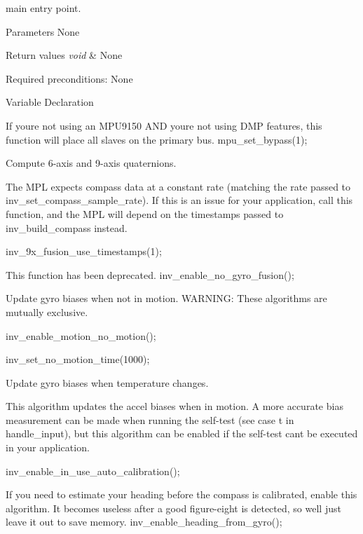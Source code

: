 main entry point. 

\begin{DoxyParagraph}{Parameters None}

\end{DoxyParagraph}

\begin{DoxyRetVals}{Return values}
{\em void} & None \\
\hline
\end{DoxyRetVals}
\begin{DoxyParagraph}{Required preconditions\+: None}

\end{DoxyParagraph}
Variable Declaration

If you\textquotesingle{}re not using an M\+P\+U9150 A\+ND you\textquotesingle{}re not using D\+MP features, this function will place all slaves on the primary bus. mpu\+\_\+set\+\_\+bypass(1);

Compute 6-\/axis and 9-\/axis quaternions.

The M\+PL expects compass data at a constant rate (matching the rate passed to inv\+\_\+set\+\_\+compass\+\_\+sample\+\_\+rate). If this is an issue for your application, call this function, and the M\+PL will depend on the timestamps passed to inv\+\_\+build\+\_\+compass instead.

inv\+\_\+9x\+\_\+fusion\+\_\+use\+\_\+timestamps(1);

This function has been deprecated. inv\+\_\+enable\+\_\+no\+\_\+gyro\+\_\+fusion();

Update gyro biases when not in motion. W\+A\+R\+N\+I\+NG\+: These algorithms are mutually exclusive.

inv\+\_\+enable\+\_\+motion\+\_\+no\+\_\+motion();

inv\+\_\+set\+\_\+no\+\_\+motion\+\_\+time(1000);

Update gyro biases when temperature changes.

This algorithm updates the accel biases when in motion. A more accurate bias measurement can be made when running the self-\/test (see case \textquotesingle{}t\textquotesingle{} in handle\+\_\+input), but this algorithm can be enabled if the self-\/test can\textquotesingle{}t be executed in your application.

inv\+\_\+enable\+\_\+in\+\_\+use\+\_\+auto\+\_\+calibration();

If you need to estimate your heading before the compass is calibrated, enable this algorithm. It becomes useless after a good figure-\/eight is detected, so we\textquotesingle{}ll just leave it out to save memory. inv\+\_\+enable\+\_\+heading\+\_\+from\+\_\+gyro();

